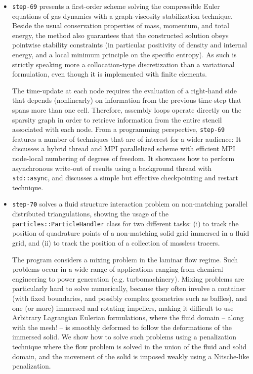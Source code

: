 \documentclass{ansarticle-preprint}
\begin{document}
\begin{itemize}
  \item \texttt{step-69} presents a first-order scheme solving the compressible
        Euler equations of gas dynamics with a graph-viscosity stabilization
        technique. Beside the usual conservation properties of mass, momentum, and
        total energy, the method also guarantees that the constructed solution
        obeys pointwise stability constraints (in particular positivity of
        density and internal
        energy, and a local minimum principle on the specific entropy). As such
         is strictly speaking more a collocation-type discretization
        than a variational formulation, even though it is implemented with finite
        elements.

        The time-update at each node requires the evaluation of a right-hand side
        that depends (nonlinearly) on information from the previous time-step that
        spans more than one cell. Therefore, assembly loops operate directly on the
        sparsity graph in order to retrieve information from the entire stencil
        associated with each node. From a programming perspective, \texttt{step-69}
        features a number of techniques that are of interest for a wider audience:
        It discusses a hybrid thread and MPI parallelized scheme with efficient
        MPI node-local numbering of degrees of freedom. It showcases how to
        perform asynchronous write-out of results using a background thread with
        \texttt{std::async}, and discusses a simple but effective checkpointing and
        restart technique.

  \item \texttt{step-70} solves a fluid structure interaction problem on
        non-matching parallel distributed triangulations, showing the usage of
        the \texttt{particles::ParticleHandler} class for two different tasks:
        (i) to track the position of quadrature points of a non-matching
        solid grid immersed in a fluid grid, and (ii) to track the position of a
        collection of massless tracers.

        The program considers a mixing problem in the laminar flow
        regime. Such problems occur in a wide range of applications ranging
        from chemical engineering to power generation (e.g. turbomachinery).
        Mixing problems are particularly hard to solve numerically, because
        they often involve a container (with fixed boundaries, and possibly
        complex geometries such as baffles), and one (or more) immersed and
        rotating impellers, making it difficult to use Arbitrary Lagrangian
        Eulerian formulations, where the fluid domain – along with the mesh! –
        is smoothly deformed to follow the deformations of the immersed solid.
        We show how to solve such problems using a penalization technique
        where the flow problem is solved in the union of the fluid and solid
        domain, and the movement of the solid is imposed weakly using a
        Nitsche-like penalization.


\end{itemize}
\end{document}
